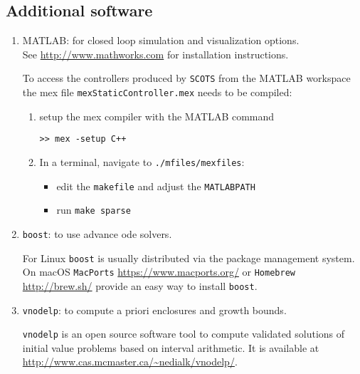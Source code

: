 \documentclass[a4paper]{amsart}
\begin{document}
\subsection{Additional software} 
\label{s:installation:cudd}
\begin{enumerate}


  \item MATLAB: for closed loop simulation and visualization options.\\
	See \url{http://www.mathworks.com} for installation instructions.

	To access the controllers produced by {\tt SCOTS} from the MATLAB workspace
  the mex file {\tt mexStaticController.mex}  needs to be compiled:
	\begin{enumerate}
 	\item setup the mex compiler with the MATLAB command
	\begin{lstlisting}[basicstyle=\small\ttfamily,frame=none]
	>> mex -setup C++
	\end{lstlisting}
	\item In a terminal, navigate to {\tt\small ./mfiles/mexfiles}:
	\begin{itemize}
    \item edit the {\tt makefile} and adjust the {\tt MATLABPATH} 
		\item run  {\tt make sparse}
  \end{itemize}
  \end{enumerate}

  \item {\tt boost}: to use advance ode solvers. 

  For Linux {\tt boost} is usually
  distributed via the package management system. On macOS {\tt MacPorts}
  \url{https://www.macports.org/} or {\tt Homebrew} \url{http://brew.sh/} provide an easy way to install
  {\tt boost}.

  \item {\tt vnodelp}: to compute a priori enclosures and growth bounds.

  {\tt vnodelp} is an open source software tool to compute validated solutions
  of initial value problems based on  interval arithmetic. It is available at
  \url{http://www.cas.mcmaster.ca/~nedialk/vnodelp/}.




\end{enumerate}
\end{document}
